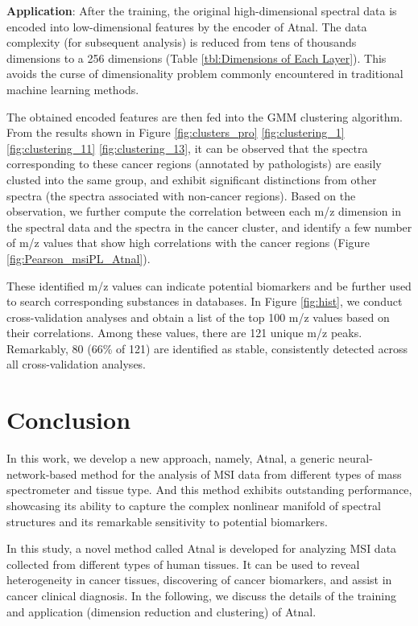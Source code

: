 \documentclass[journal=jacsat,manuscript=article]{achemso}
\begin{document}
\textbf{Application}: After the training, the original high-dimensional 
spectral data is encoded into 
low-dimensional features by the encoder of Atnal. 
The data complexity (for subsequent 
analysis) is reduced from tens of thousands dimensions 
to a 256 dimensions (Table \ref{tbl:Dimensions of Each Layer}). This avoids 
the curse of dimensionality problem commonly encountered in traditional machine 
learning methods.

The obtained encoded features are then fed into the 
GMM clustering algorithm.  
From the results shown in Figure \ref{fig:clusters_pro} 
\ref{fig:clustering_1} \ref{fig:clustering_11} \ref{fig:clustering_13}, 
it can be observed that the spectra  
corresponding to these cancer regions (annotated by pathologists) are 
easily clusted into the same group, and exhibit 
significant distinctions from other spectra (the spectra associated with non-cancer regions). 
Based on the observation, 
we further compute the correlation between each m/z dimension in the 
spectral data and the spectra in the cancer cluster, and identify a few number of m/z 
values that show high correlations with the cancer regions
(Figure \ref{fig:Pearson_msiPL_Atnal}).  

These identified m/z values can 
indicate potential biomarkers and be further used to search
corresponding substances in databases. In Figure \ref{fig:hist}, 
we conduct cross-validation analyses and obtain a list of the top 
100 m/z values based on their correlations. Among these values, there are 121 unique 
m/z peaks. Remarkably, 
80 (66\% of 121) are identified as stable, consistently 
detected across all cross-validation analyses. 

\section{Conclusion}
In this work, we develop a new approach, namely, 
Atnal, a generic neural-network-based method for the 
analysis of MSI data from different types of mass spectrometer and tissue type. 
And this method exhibits outstanding performance, showcasing its ability 
to capture the complex nonlinear manifold of spectral structures and 
its remarkable sensitivity to potential biomarkers. 

In this study, a novel method called Atnal is developed for analyzing MSI data collected from 
different types of human tissues. It can be used to reveal heterogeneity in cancer tissues, 
discovering of cancer biomarkers, and assist in cancer clinical diagnosis. In the following, we 
discuss the details of the training and application (dimension reduction and clustering) of 
Atnal. 
\end{document}
